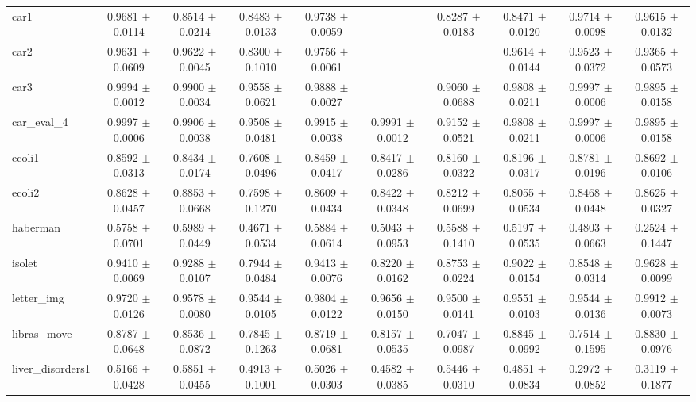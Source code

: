 \begin{table*}[htbp]
\begin{tabular}{lccccccccc}
            car1 & 0.9681 $\pm$ 0.0114 & 0.8514 $\pm$ 0.0214 & 0.8483 $\pm$ 0.0133 & 0.9738 $\pm$ 0.0059 &  & 0.8287 $\pm$ 0.0183 & 0.8471 $\pm$ 0.0120 & 0.9714 $\pm$ 0.0098 & 0.9615 $\pm$ 0.0132 \\ 
            car2 & 0.9631 $\pm$ 0.0609 & 0.9622 $\pm$ 0.0045 & 0.8300 $\pm$ 0.1010 & 0.9756 $\pm$ 0.0061 &  &  & 0.9614 $\pm$ 0.0144 & 0.9523 $\pm$ 0.0372 & 0.9365 $\pm$ 0.0573 \\ 
            car3 & 0.9994 $\pm$ 0.0012 & 0.9900 $\pm$ 0.0034 & 0.9558 $\pm$ 0.0621 & 0.9888 $\pm$ 0.0027 &  & 0.9060 $\pm$ 0.0688 & 0.9808 $\pm$ 0.0211 & 0.9997 $\pm$ 0.0006 & 0.9895 $\pm$ 0.0158 \\ 
            car\_eval\_4 & 0.9997 $\pm$ 0.0006 & 0.9906 $\pm$ 0.0038 & 0.9508 $\pm$ 0.0481 & 0.9915 $\pm$ 0.0038 & 0.9991 $\pm$ 0.0012 & 0.9152 $\pm$ 0.0521 & 0.9808 $\pm$ 0.0211 & 0.9997 $\pm$ 0.0006 & 0.9895 $\pm$ 0.0158 \\ 
            ecoli1 & 0.8592 $\pm$ 0.0313 & 0.8434 $\pm$ 0.0174 & 0.7608 $\pm$ 0.0496 & 0.8459 $\pm$ 0.0417 & 0.8417 $\pm$ 0.0286 & 0.8160 $\pm$ 0.0322 & 0.8196 $\pm$ 0.0317 & 0.8781 $\pm$ 0.0196 & 0.8692 $\pm$ 0.0106 \\ 
            ecoli2 & 0.8628 $\pm$ 0.0457 & 0.8853 $\pm$ 0.0668 & 0.7598 $\pm$ 0.1270 & 0.8609 $\pm$ 0.0434 & 0.8422 $\pm$ 0.0348 & 0.8212 $\pm$ 0.0699 & 0.8055 $\pm$ 0.0534 & 0.8468 $\pm$ 0.0448 & 0.8625 $\pm$ 0.0327 \\ 
            haberman & 0.5758 $\pm$ 0.0701 & 0.5989 $\pm$ 0.0449 & 0.4671 $\pm$ 0.0534 & 0.5884 $\pm$ 0.0614 & 0.5043 $\pm$ 0.0953 & 0.5588 $\pm$ 0.1410 & 0.5197 $\pm$ 0.0535 & 0.4803 $\pm$ 0.0663 & 0.2524 $\pm$ 0.1447 \\ 
            isolet & 0.9410 $\pm$ 0.0069 & 0.9288 $\pm$ 0.0107 & 0.7944 $\pm$ 0.0484 & 0.9413 $\pm$ 0.0076 & 0.8220 $\pm$ 0.0162 & 0.8753 $\pm$ 0.0224 & 0.9022 $\pm$ 0.0154 & 0.8548 $\pm$ 0.0314 & 0.9628 $\pm$ 0.0099 \\ 
            letter\_img & 0.9720 $\pm$ 0.0126 & 0.9578 $\pm$ 0.0080 & 0.9544 $\pm$ 0.0105 & 0.9804 $\pm$ 0.0122 & 0.9656 $\pm$ 0.0150 & 0.9500 $\pm$ 0.0141 & 0.9551 $\pm$ 0.0103 & 0.9544 $\pm$ 0.0136 & 0.9912 $\pm$ 0.0073 \\ 
            libras\_move & 0.8787 $\pm$ 0.0648 & 0.8536 $\pm$ 0.0872 & 0.7845 $\pm$ 0.1263 & 0.8719 $\pm$ 0.0681 & 0.8157 $\pm$ 0.0535 & 0.7047 $\pm$ 0.0987 & 0.8845 $\pm$ 0.0992 & 0.7514 $\pm$ 0.1595 & 0.8830 $\pm$ 0.0976 \\ 
            liver\_disorders1 & 0.5166 $\pm$ 0.0428 & 0.5851 $\pm$ 0.0455 & 0.4913 $\pm$ 0.1001 & 0.5026 $\pm$ 0.0303 & 0.4582 $\pm$ 0.0385 & 0.5446 $\pm$ 0.0310 & 0.4851 $\pm$ 0.0834 & 0.2972 $\pm$ 0.0852 & 0.3119 $\pm$ 0.1877 \\ 

\end{tabular}
\end{table*}
